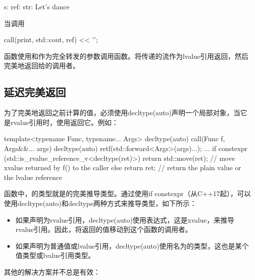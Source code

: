 \begin{outputcode}
s:
ref:
str: Let's dance
\end{outputcode}

当调用

\begin{cppcode}
call(print, std::cout, ref) << '\n';
\end{cppcode}

函数使用和作为完全转发的参数调用函数。将传递的流作为lvalue引用返回，然后完美地返回给的调用者。

\subsection{延迟完美返回}

为了完美地返回之前计算的值，必须使用decltype(auto)声明一个局部对象，当它是rvalue引用时，使用返回它。例如：

\begin{cppcode}
template<typename Func, typename... Args>
decltype(auto) call(Func f, Args&&... args)
{
	decltype(auto) ret{f(std::forward<Args>(args)...)};
	...
	if constexpr (std::is_rvalue_reference_v<decltype(ret)>) {
		return std::move(ret); // move xvalue returned by f() to the caller
	}
	else {
		return ret; // return the plain value or the lvalue reference
	}
}
\end{cppcode}

函数中，的类型就是的完美推导类型。通过使用if constexpr（从C++17起），可以使用decltype(auto)和decltype两种方式来推导类型，如下所示：

\begin{itemize}
	\item 如果声明为rvalue引用，decltype(auto)使用表达式，这是xvalue，来推导rvalue引用。因此，将返回的值移动到这个函数的调用者。
	\item 如果声明为普通值或lvalue引用，decltype(auto)使用名为的类型，这也是某个值类型或lvalue引用类型。
\end{itemize}

其他的解决方案并不总是有效：

